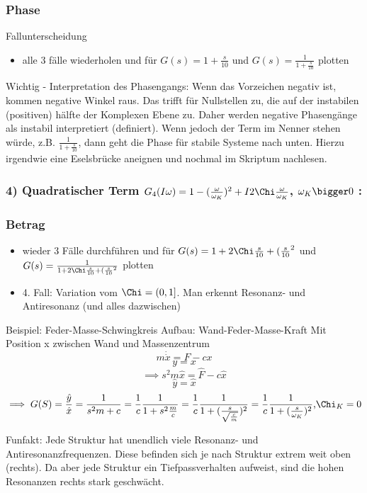 \documentclass[a4paper]{article}
\begin{document}
\subsubsection*{Phase}
Fallunterscheidung
\begin{itemize}
    \item alle 3 fälle wiederholen und für $G(s)=1+\frac{s}{10}$ und $G(s)=\frac{1}{1+\frac{s}{10}}$ plotten
\end{itemize}
Wichtig - Interpretation des Phasengangs: Wenn das Vorzeichen negativ ist, kommen negative Winkel raus. Das trifft für Nullstellen zu, die auf der instabilen (positiven) hälfte der Komplexen Ebene zu. Daher werden negative Phasengänge als instabil interpretiert (definiert).
Wenn jedoch der Term im Nenner stehen würde, z.B. $\frac{1}{1+\frac{s}{10}}$, dann geht die Phase für stabile Systeme nach unten.\newline
Hierzu irgendwie eine Eselsbrücke aneignen und nochmal im Skriptum nachlesen.

\subsubsection*{4) Quadratischer Term $G_{4}(I\omega)=1-(\frac{\omega}{\omega_{K}})^{2}+I2\Chi\frac{\omega}{ \omega_{K}}$, $\omega_{K}\bigger0$ :}
\subsubsection*{Betrag}
\begin{itemize}
    \item wieder 3 Fälle durchführen und für $G(s)=1+2\Chi\frac{s}{10} +(\frac{s}{10}^{2}$ und $G(s)=\frac{1}{1+2\Chi\frac{s}{10} +(\frac{s}{10}^{2}}$ plotten
    \item 4. Fall: Variation vom $\Chi=(0, 1]$. Man erkennt Resonanz- und Antiresonanz (und alles dazwischen)
\end{itemize}
Beispiel: Feder-Masse-Schwingkreis
Aufbau: Wand-Feder-Masse-Kraft
Mit Position x zwischen Wand und Massenzentrum
\[ m \dot\dot x = F-cx \]
\[ y=x \]
\[ \implies s^{2}m \hat{x}=\hat{F}-c \hat{x} \]
\[ \hat{y}=\hat{x} \]
\[ \implies G(S)=\frac{\hat{y}}{\hat{x}}=\frac{1}{s^{2}m+c}=\frac{1}{c}\frac{1}{1+s^{2}\frac{m}{c}}=\frac{1}{c}\frac{1}{1+(\frac{s}{\sqrt{\frac{c}{m}} })^{2}}=\frac{1}{c}\frac{1}{1+(\frac{s}{\omega_{K}})^{2}}\text{,} \Chi_{K}=0\]

Funfakt: Jede Struktur hat unendlich viele Resonanz- und Antiresonanzfrequenzen. Diese befinden sich je nach Struktur extrem weit oben (rechts). Da aber jede Struktur ein Tiefpassverhalten aufweist, sind die hohen Resonanzen rechts stark geschwächt. 
\end{document}
